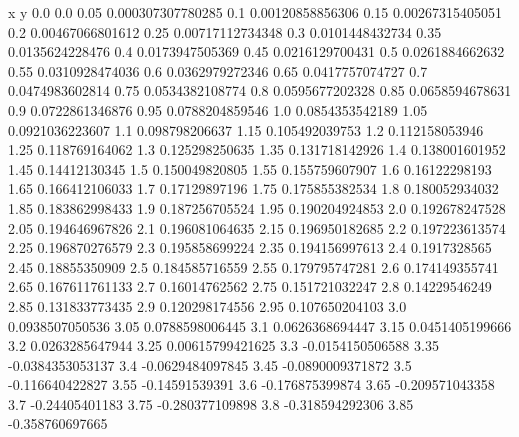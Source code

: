               x                y
            0.0              0.0
           0.05  0.000307307780285
            0.1  0.00120858856306
           0.15  0.00267315405051
            0.2  0.00467066801612
           0.25  0.00717112734348
            0.3  0.0101448432734
           0.35  0.0135624228476
            0.4  0.0173947505369
           0.45  0.0216129700431
            0.5  0.0261884662632
           0.55  0.0310928474036
            0.6  0.0362979272346
           0.65  0.0417757074727
            0.7  0.0474983602814
           0.75  0.0534382108774
            0.8  0.0595677202328
           0.85  0.0658594678631
            0.9  0.0722861346876
           0.95  0.0788204859546
            1.0  0.0854353542189
           1.05  0.0921036223607
            1.1   0.098798206637
           1.15   0.105492039753
            1.2   0.112158053946
           1.25   0.118769164062
            1.3   0.125298250635
           1.35   0.131718142926
            1.4   0.138001601952
           1.45    0.14412130345
            1.5   0.150049820805
           1.55   0.155759607907
            1.6    0.16122298193
           1.65   0.166412106033
            1.7    0.17129897196
           1.75   0.175855382534
            1.8   0.180052934032
           1.85   0.183862998433
            1.9   0.187256705524
           1.95   0.190204924853
            2.0   0.192678247528
           2.05   0.194646967826
            2.1   0.196081064635
           2.15   0.196950182685
            2.2   0.197223613574
           2.25   0.196870276579
            2.3   0.195858699224
           2.35   0.194156997613
            2.4     0.1917328565
           2.45    0.18855350909
            2.5   0.184585716559
           2.55   0.179795747281
            2.6   0.174149355741
           2.65   0.167611761133
            2.7    0.16014762562
           2.75   0.151721032247
            2.8    0.14229546249
           2.85   0.131833773435
            2.9   0.120298174556
           2.95   0.107650204103
            3.0  0.0938507050536
           3.05  0.0788598006445
            3.1  0.0626368694447
           3.15  0.0451405199666
            3.2  0.0263285647944
           3.25  0.00615799421625
            3.3  -0.0154150506588
           3.35  -0.0384353053137
            3.4  -0.0629484097845
           3.45  -0.0890009371872
            3.5  -0.116640422827
           3.55   -0.14591539391
            3.6  -0.176875399874
           3.65  -0.209571043358
            3.7   -0.24405401183
           3.75  -0.280377109898
            3.8  -0.318594292306
           3.85  -0.358760697665
